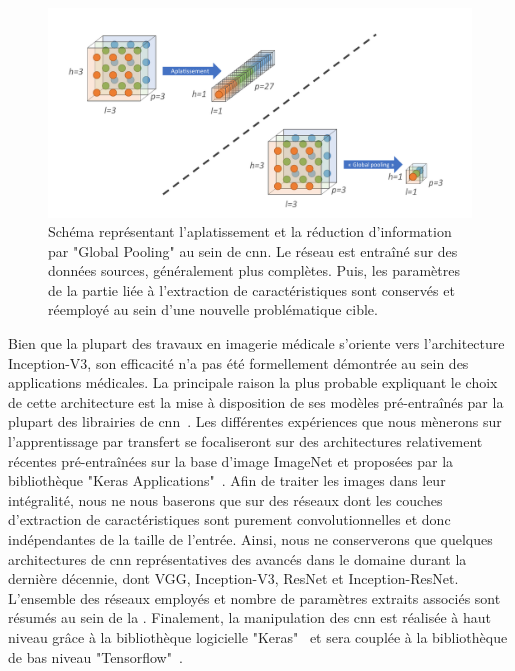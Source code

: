 \begin{figure}[H]
    \centering
    \includegraphics[width=\linewidth]{contents/chapter_4/resources/scheme_global_pooling.pdf}
    \caption{Schéma représentant l'aplatissement et la réduction d'information par "Global Pooling" au sein de \gls{cnn}. Le réseau est entraîné sur des données sources, généralement plus complètes. Puis, les paramètres de la partie liée à l'extraction de caractéristiques sont conservés et réemployé au sein d'une nouvelle problématique cible.}
    \label{fig:scheme_global_pooling}
\end{figure}\par

Bien que la plupart des travaux en imagerie médicale s'oriente vers l'architecture Inception-V3, son efficacité n'a pas été formellement démontrée au sein des applications médicales. La principale raison la plus probable expliquant le choix de cette architecture est la mise à disposition de ses modèles pré-entraînés par la plupart des librairies de \gls{cnn}~\cite{Litjens2017}. Les différentes expériences que nous mènerons sur l'apprentissage par transfert se focaliseront sur des architectures relativement récentes pré-entraînées sur la base d'image ImageNet et proposées par la bibliothèque "Keras Applications"~\cite{chollet2015a}. Afin de traiter les images dans leur intégralité, nous ne nous baserons que sur des réseaux dont les couches d'extraction de caractéristiques sont purement convolutionnelles et donc indépendantes de la taille de l'entrée. Ainsi, nous ne conserverons que quelques architectures de \gls{cnn} représentatives des avancés dans le domaine durant la dernière décennie, dont VGG, Inception-V3, ResNet et Inception-ResNet. L'ensemble des réseaux employés et nombre de paramètres extraits associés sont résumés au sein de la . Finalement, la manipulation des \ac{cnn} est réalisée à haut niveau grâce à la bibliothèque logicielle "Keras"~\cite{chollet2015} et sera couplée à la bibliothèque de bas niveau "Tensorflow"~\cite{tensorflow2015}.\par

